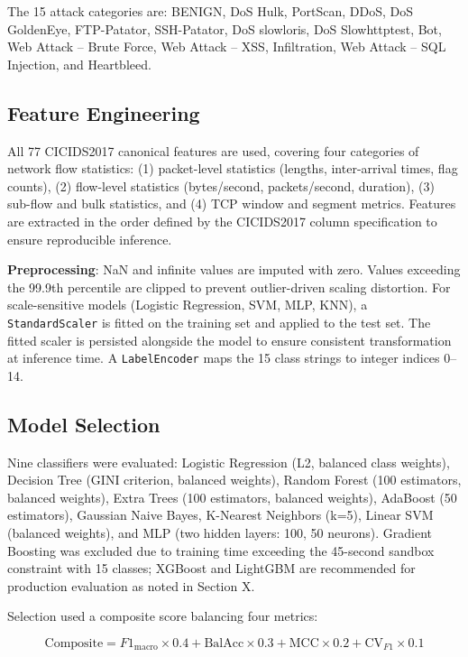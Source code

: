 \documentclass[conference]{IEEEtran}
\begin{document}
The 15 attack categories are: BENIGN, DoS Hulk, PortScan, DDoS, DoS GoldenEye, FTP-Patator, SSH-Patator, DoS slowloris, DoS Slowhttptest, Bot, Web Attack -- Brute Force, Web Attack -- XSS, Infiltration, Web Attack -- SQL Injection, and Heartbleed.

\subsection{Feature Engineering}

All 77 CICIDS2017 canonical features are used, covering four categories of network flow statistics: (1) packet-level statistics (lengths, inter-arrival times, flag counts), (2) flow-level statistics (bytes/second, packets/second, duration), (3) sub-flow and bulk statistics, and (4) TCP window and segment metrics. Features are extracted in the order defined by the CICIDS2017 column specification to ensure reproducible inference.

\textbf{Preprocessing}: NaN and infinite values are imputed with zero. Values exceeding the 99.9th percentile are clipped to prevent outlier-driven scaling distortion. For scale-sensitive models (Logistic Regression, SVM, MLP, KNN), a \texttt{StandardScaler} is fitted on the training set and applied to the test set. The fitted scaler is persisted alongside the model to ensure consistent transformation at inference time. A \texttt{LabelEncoder} maps the 15 class strings to integer indices 0--14.

\subsection{Model Selection}

Nine classifiers were evaluated: Logistic Regression (L2, balanced class weights), Decision Tree (GINI criterion, balanced weights), Random Forest (100 estimators, balanced weights), Extra Trees (100 estimators, balanced weights), AdaBoost (50 estimators), Gaussian Naive Bayes, K-Nearest Neighbors (k=5), Linear SVM (balanced weights), and MLP (two hidden layers: 100, 50 neurons). Gradient Boosting was excluded due to training time exceeding the 45-second sandbox constraint with 15 classes; XGBoost and LightGBM are recommended for production evaluation as noted in Section X.

Selection used a composite score balancing four metrics:

\begin{equation}
\text{Composite} = F1_{\text{macro}} \times 0.4 + \text{BalAcc} \times 0.3 + \text{MCC} \times 0.2 + \text{CV}_{F1} \times 0.1
\label{eq:composite}
\end{equation}
\end{document}
